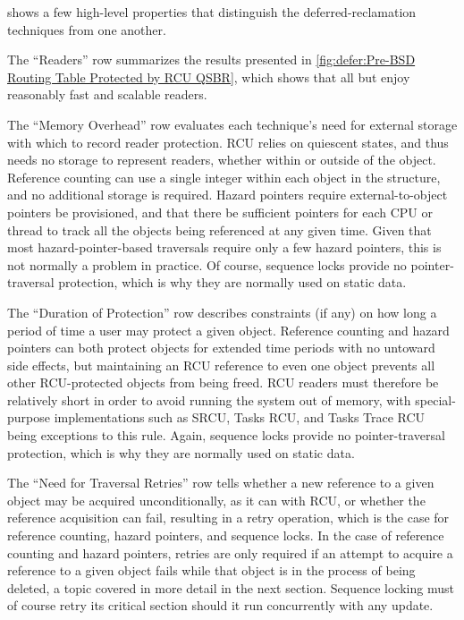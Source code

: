 shows a few high-level properties that distinguish the deferred-reclamation
techniques from one another.

The ``Readers'' row summarizes the results presented in
\cref{fig:defer:Pre-BSD Routing Table Protected by RCU QSBR},
which shows that all but 
enjoy reasonably fast and scalable readers.

The ``Memory Overhead'' row evaluates each technique's need
for external storage with which to record reader protection.
RCU relies on quiescent states, and thus needs no storage to represent
readers, whether within or outside of the object.
Reference counting can use a single integer within each object in the
structure, and no additional storage is required.
Hazard pointers require external-to-object pointers be provisioned,
and that there be sufficient pointers for each CPU or thread to
track all the objects being referenced at any given time.
Given that most hazard-pointer-based traversals require only a few
hazard pointers, this is not normally a problem in practice.
Of course, sequence locks provide no pointer-traversal protection,
which is why they are normally used on static data.

\QuickQuizEnd

The ``Duration of Protection'' row describes constraints (if any) on how
long a period of time a user may protect a given object.
Reference counting and hazard pointers can both protect objects for
extended time periods with no untoward side effects, but
maintaining an RCU reference to even one object prevents all other
RCU-protected objects from being freed.
RCU readers must therefore be relatively short in order to avoid running
the system out of memory, with special-purpose implementations such
as SRCU, Tasks RCU, and Tasks Trace RCU being exceptions to this rule.
Again, sequence locks provide no pointer-traversal protection,
which is why they are normally used on static data.

The ``Need for Traversal Retries'' row tells whether a new reference to
a given object may be acquired unconditionally, as it can with RCU, or
whether the reference acquisition can fail, resulting in a retry
operation, which is the case for reference counting, hazard pointers,
and sequence locks.
In the case of reference counting and hazard pointers, retries are only
required if an attempt to acquire a reference to a given object fails
while that object is in the process of being deleted, a topic covered in
more detail in the next section.
Sequence locking must of course retry its critical section should it
run concurrently with any update.

